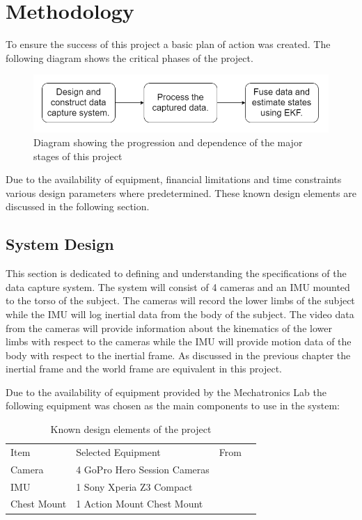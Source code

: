 \chapter{Methodology}
To ensure the success of this project a basic plan of action was created. The following diagram shows the critical phases of the project.

\begin{figure}[!ht] 
\captionsetup{width=0.8\linewidth, font=small}  
\includegraphics[width=0.8\linewidth]{figures/planOfAction.png}
  \caption{Diagram showing the progression and dependence of the major stages of this project}
\label{fig:planOfAction}
\end{figure}

Due to the availability of equipment, financial limitations and time constraints various design parameters where predetermined. These known design elements are discussed in the following section.
  
\section{System Design}
This section is dedicated to defining and understanding the specifications of the data capture system. The system will consist of 4 cameras and an IMU mounted to the torso of the subject. The cameras will record the lower limbs of the subject while the IMU will log inertial data from the body of the subject. The video data from the cameras will provide information about the kinematics of the lower limbs with respect to the cameras while the IMU will provide motion data of the body with respect to the inertial frame. As discussed in the previous chapter the inertial frame and the world frame are equivalent in this project. 

Due to the availability of equipment provided by the Mechatronics Lab the following equipment was chosen as the main components to use in the system:


\begin{table}[!ht]
\label{equipment-table}
\begin{tabular}{llll}
Item		& Selected Equipment				& From		  			\\
Camera      & 4 GoPro Hero Session Cameras  & \cite{gopro} 		\\
IMU         & 1 Sony Xperia Z3 Compact      & \cite{sony}  		\\
Chest Mount & 1 Action Mount Chest Mount    & \cite{actionmounts}   
\end{tabular}
\caption{Known design elements of the project}
\end{table}

